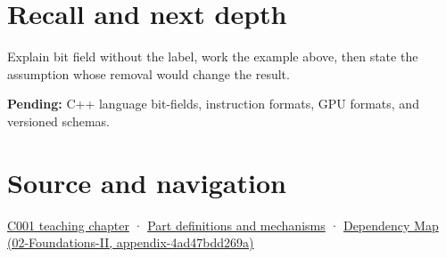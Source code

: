 \section{Recall and next depth}\label{appendix-ac697f5c66e8-recall-and-next-depth}

Explain bit field without the label, work the example above, then state the assumption whose removal would change the result.

\textbf{Pending:} C++ language bit-fields, instruction formats, GPU formats, and versioned schemas.

\section{Source and navigation}\label{appendix-ac697f5c66e8-source-and-navigation}

\href{Continuous\%20Notes/Computing\%20Foundations\%20-\%20From\%20Bits\%20to\%20C++\%20and\%20Systems\%20APIs\#From\%20a\%20signal\%20to\%20an\%20interpretation}{C001 teaching chapter} · \hyperref[appendix-fd090d982a15]{Part definitions and mechanisms} · \href{../02-Foundations-II/main.pdf\#nameddest=appendix-4ad47bdd269a}{Dependency Map (02-Foundations-II, appendix-4ad47bdd269a)}
